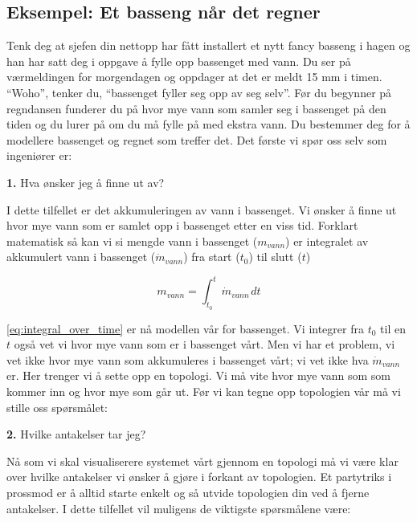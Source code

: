  
\subsection{Eksempel: Et basseng når det regner}
Tenk deg at sjefen din nettopp har fått installert et nytt fancy basseng i hagen og han har satt deg i oppgave å fylle opp bassenget med vann. Du ser på værmeldingen for morgendagen og oppdager at det er meldt 15 mm i timen. \enquote{Woho}, tenker du, \enquote{bassenget fyller seg opp av seg selv}. Før du begynner på regndansen funderer du på hvor mye vann som samler seg i bassenget på den tiden og du lurer på om du må fylle på med ekstra vann. Du bestemmer deg for å modellere bassenget og regnet som treffer det. Det første vi spør oss selv som ingeniører er: 

\begin{center}
    \textbf{1.} Hva ønsker jeg å finne ut av?
\end{center}

I dette tilfellet er det akkumuleringen av vann i bassenget. Vi ønsker å finne ut hvor mye vann som er samlet opp i bassenget etter en viss tid. Forklart matematisk så kan vi si mengde vann i bassenget ($m_{vann}$) er integralet av akkumulert vann i bassenget ($\dot{m}_{vann}$) fra start ($t_0$) til slutt ($t$)

\begin{equation}\label{eq:integral_over_time}
    m_{vann} = \int_{t_0}^{t}\dot{m}_{vann\,}dt 
\end{equation}

\cref{eq:integral_over_time} er nå modellen vår for bassenget. Vi integrer fra $t_0$ til en $t$ også vet vi hvor mye vann som er i bassenget vårt. Men vi har et problem, vi vet ikke hvor mye vann som akkumuleres i bassenget vårt; vi vet ikke hva $\dot{m}_{vann}$ er. Her trenger vi å sette opp en topologi. Vi må vite hvor mye vann som som kommer inn og hvor mye som går ut. Før vi kan tegne opp topologien vår må vi stille oss spørsmålet:

\begin{center}
    \textbf{2.} Hvilke antakelser tar jeg?
\end{center}

Nå som vi skal visualiserere systemet vårt gjennom en topologi må vi være klar over hvilke antakelser vi ønsker å gjøre i forkant av topologien. Et partytriks i prossmod er å alltid starte enkelt og så utvide topologien din ved å fjerne antakelser. I dette tilfellet vil muligens de viktigste spørsmålene være:

